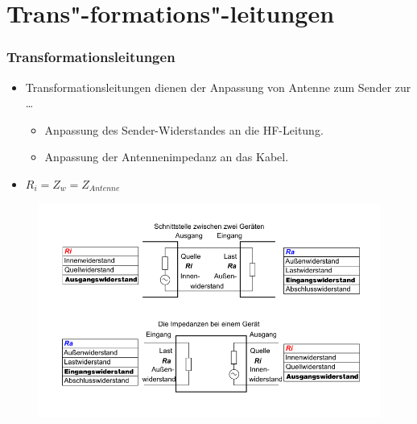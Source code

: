 \section*{Trans"-formations"-leitungen}
\begin{frame}
  \frametitle{Transformationsleitungen}
  \begin{itemize}
    \item Transformationsleitungen dienen der Anpassung von Antenne zum Sender zur \dots
      \begin{itemize}
        \item Anpassung des Sender-Widerstandes an die HF-Leitung.
        \item Anpassung der Antennenimpedanz an das Kabel.
      \end{itemize}
    \item $R_i = Z_w = Z_{Antenne}$
  \end{itemize}
\end{frame}

\begin{frame}
  \begin{center}
    \begin{figure}
      \includegraphics[width=\textwidth,height=.8\textheight,keepaspectratio]{a10/800px-EingangswiderstandAusgangswiderstandA.png}
    \end{figure}
  \end{center}
\end{frame}


